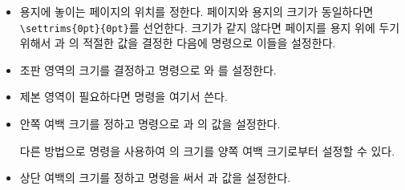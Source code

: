 \begin{itemize}
\item 용지에 놓이는 페이지의 위치를 정한다. 페이지와 용지의 크기가 동일하다면
\verb?\settrims{0pt}{0pt}?를 선언한다. 크기가 같지 않다면 페이지를 용지
위에 두기 위해서 \lnc{\trimtop}과 \lnc{\trimedge}의 적절한 값을 결정한 다음에
\cmd{\settrimes} 명령으로 이들을 설정한다.
\item 조판 영역의 크기를 결정하고 \cmd{\settypeblocksize} 명령으로 \lnc{\textheight}와 \lnc{\textwidth}를 설정한다.
\item 제본 영역이 필요하다면 \cmd{\setbinding} 명령을 여기서 쓴다.
\item 안쪽 여백 크기를 정하고 \cmd{\setlrmargins} 명령으로 \lnc{\spinemargin}과 \lnc{\foremargin}의 값을 설정한다.

다른 방법으로 \cmd{\setlrmarginsandblock} 명령을 사용하여 \lnc{\textwidth}의 크기를 양쪽 여백 크기로부터 설정할 수 있다.

\item 상단 여백의 크기를 정하고 \cmd{\setulmargins} 명령을 써서 \lnc{\uppermargin}과 \lnc{\lowermargin} 값을 설정한다.


\end{itemize}
